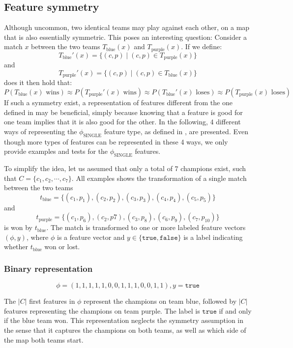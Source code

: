 \subsection{Feature symmetry}
\label{sec:representationoffeatures}
Although uncommon, two identical teams may play against each other, on a map that is also essentially symmetric.
This poses an interesting question:
Consider a match $x$ between the two teams $T_\text{blue}(x)$ and $T_\text{purple}(x)$.
If we define:
\[T_\text{blue}'(x) = \{(c,p) \mid (c,p) \in T_\text{purple}(x)\}\] 
and 
\[T_\text{purple}'(x) = \{(c,p) \mid (c,p) \in T_\text{blue}(x)\}\]
does it then hold that: 
\[P(T_\text{blue}(x) \text{ wins}) \approx P(T_\text{purple}'(x) \text{ wins}) \approx P(T_\text{blue}'(x) \text{ loses}) \approx P(T_\text{purple}(x) \text{ loses})\]
If such a symmetry exist, a representation of features different from the one defined in  may be beneficial, simply because knowing that a feature is good for one team implies that it is also good for the other.
In the following, 4 different ways of representing the $\phi_\text{SINGLE}$ feature type, as defined in , are presented.
Even though more types of features can be represented in these 4 ways, we only provide examples and tests for the $\phi_\text{SINGLE}$ features.

To simplify the idea, let us assumed that only a total of $7$ champions exist, such that $C = \{c_1, c_2, \cdots, c_7\}$.
All examples shows the transformation of a single match between the two teams \[t_\text{blue} = \{(c_1, p_1), (c_2,p_2), (c_3,p_3), (c_4,p_4), (c_5, p_5)\}\] 
and
\[t_\text{purple} = \{(c_1, p_6),(c_2,p7), (c_3,p_8),(c_6,p_9),(c_7,p_{10})\}\] 
is won by $t_\text{blue}$. The match is transformed to one or more labeled feature vectors $(\phi, y)$, where $\phi$ is a feature vector and $y \in \{\mathtt{true}, \mathtt{false}\}$ is a label indicating whether $t_\text{blue}$ won or lost.

\subsubsection{Binary representation}

\[ \phi = (1,1,1,1,1,0,0,1,1,1,0,0,1,1), y = \mathtt{true} \]

The $|C|$ first features in $\phi$ represent the champions on team blue, followed by $|C|$ features representing the champions on team purple. The label is $\mathtt{true}$ if and only if the blue team won.
This representation neglects the symmetry assumption in the sense that it captures the champions on both teams, as well as which side of the map both teams start.

